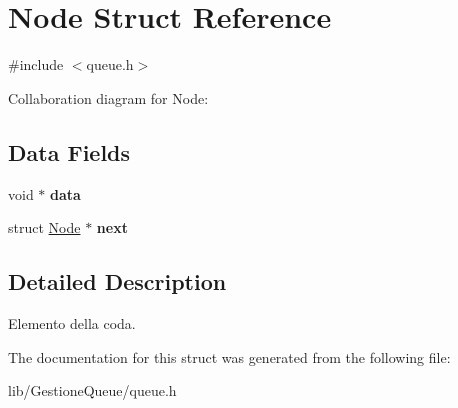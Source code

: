 \hypertarget{struct_node}{}\section{Node Struct Reference}
\label{struct_node}


{\ttfamily \#include $<$queue.\+h$>$}



Collaboration diagram for Node\+:
\subsection*{Data Fields}
\begin{DoxyCompactItemize}
\item 
\mbox{\label{struct_node_a735984d41155bc1032e09bece8f8d66d}} 
void $\ast$ {\bfseries data}
\item 
\mbox{\label{struct_node_aa162dd1e0693188a22b1f13b9a2a0ef0}} 
struct \hyperlink{struct_node}{Node} $\ast$ {\bfseries next}
\end{DoxyCompactItemize}


\subsection{Detailed Description}
Elemento della coda. 

The documentation for this struct was generated from the following file\+:\begin{DoxyCompactItemize}
\item 
lib/\+Gestione\+Queue/queue.\+h\end{DoxyCompactItemize}
